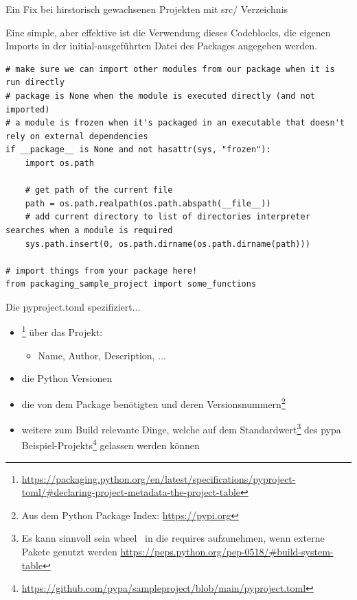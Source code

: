 \documentclass[12pt, aspectratio=169, usepdftitle=false]{beamer}
\newcommand{\furl}[1]{\footnote{\url{#1}}}
\begin{document}
\begin{frame}[fragile]{Ein Fix bei hirstorisch gewachsenen Projekten mit src/ Verzeichnis}
	
	Eine simple, aber effektive  ist die Verwendung dieses Codeblocks,  die eigenen Imports in der initial-ausgeführten Datei des Packages angegeben werden.
	\pause
	
	
	\begin{lstlisting}[language=pytiny]
# make sure we can import other modules from our package when it is run directly
# package is None when the module is executed directly (and not imported)
# a module is frozen when it's packaged in an executable that doesn't rely on external dependencies
if __package__ is None and not hasattr(sys, "frozen"):
    import os.path

    # get path of the current file
    path = os.path.realpath(os.path.abspath(__file__))
    # add current directory to list of directories interpreter searches when a module is required
    sys.path.insert(0, os.path.dirname(os.path.dirname(path)))

# import things from your package here!
from packaging_sample_project import some_functions
	\end{lstlisting}
	
\end{frame}


\begin{frame}{Die pyproject.toml spezifiziert...}
	\begin{itemize}
		\item {}\furl{https://packaging.python.org/en/latest/specifications/pyproject-toml/\#declaring-project-metadata-the-project-table} über das Projekt:
		\begin{itemize}
			\item Name, Author, Description, ...
		\end{itemize}
		\item die  Python Versionen
		\item die von dem Package benötigten  und deren Versionsnummern\footnote{Aus dem Python Package Index: \url{https://pypi.org}}
		\item weitere zum Build relevante Dinge, welche auf dem Standardwert\footnote{Es kann sinnvoll sein \glqq wheel\grqq~ in die requires aufzunehmen, wenn externe Pakete genutzt werden \url{https://peps.python.org/pep-0518/\#build-system-table}} des pypa Beispiel-Projekts\furl{https://github.com/pypa/sampleproject/blob/main/pyproject.toml} gelassen werden können
	\end{itemize}
	
	
\end{frame}
\end{document}

